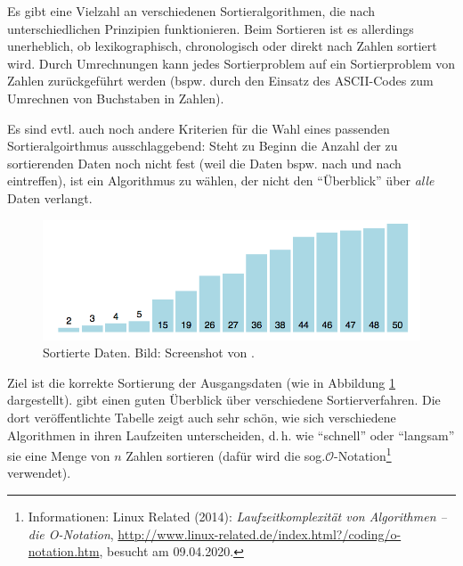 \documentclass[11pt, a4paper, oneside, openright]{article}
\newcommand \dasheisst{d.\,h.\xspace }
\newcommand \bspw{bspw.\xspace }
\newcommand \evtl{evtl.\xspace }
\newcommand \sog{sog.\xspace }
\begin{document}
Es gibt eine Vielzahl an verschiedenen Sortieralgorithmen, die nach unterschiedlichen Prinzipien funktionieren. Beim Sortieren ist es allerdings unerheblich, ob lexikographisch, chronologisch oder direkt nach Zahlen sortiert wird. Durch Umrechnungen kann jedes Sortierproblem auf ein Sortierproblem von Zahlen zurückgeführt werden (\bspw durch den Einsatz des ASCII-Codes zum Umrechnen von Buchstaben in Zahlen).

Es sind \evtl auch noch andere Kriterien für die Wahl eines passenden Sortieralgoirthmus ausschlaggebend: Steht zu Beginn die Anzahl der zu sortierenden Daten noch nicht fest (weil die Daten \bspw nach und nach eintreffen), ist ein Algorithmus zu wählen, der nicht den \enquote{Überblick} über \emph{alle} Daten verlangt.

\begin{figure}[H]
    \centering
    \includegraphics[width=12cm]{bilder/sortierte_Daten.png}
    \caption[Sortierte Daten.]{Sortierte Daten. Bild: Screenshot von \cite{visualgoQS}.}
    \label{fig:sortierteDaten}
\end{figure}

Ziel ist die korrekte Sortierung der Ausgangsdaten (wie in Abbildung \ref{fig:sortierteDaten} dargestellt). \cite{wikiSortierverfahren} gibt einen guten Überblick über verschiedene Sortierverfahren. Die dort veröffentlichte Tabelle zeigt auch sehr schön, wie sich verschiedene Algorithmen in ihren Laufzeiten unterscheiden, \dasheisst wie \enquote{schnell} oder \enquote{langsam} sie eine Menge von $n$ Zahlen sortieren (dafür wird die \sog $\mathcal{O}$-Notation\footnote{Informationen: Linux Related (2014): \emph{Laufzeitkomplexität von Algorithmen -- die O-Notation}, \url{http://www.linux-related.de/index.html?/coding/o-notation.htm}, besucht am 09.04.2020.} verwendet).
\end{document}

